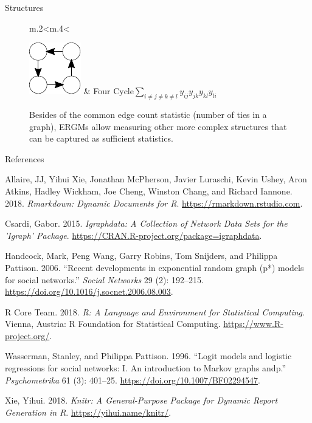 \documentclass[10pt,ignorenonframetext,aspectratio=169,]{beamer}
\begin{document}
\begin{frame}{Structures}
\begin{figure}
\begin{tabular}{m{.2\linewidth}<\centering m{.4\linewidth}<\raggedright}
\includegraphics[width=.45\linewidth]{terms/fourcycle.pdf} & Four Cycle\linebreak[4]$\sum_{i\neq j \neq k \neq l}y_{ij}y_{jk}y_{kl}y_{li}$  \\
\bottomrule
\end{tabular}
\caption{\label{fig:ergm-structs}Besides of the common edge count statistic (number of ties in a graph), ERGMs allow measuring other more complex structures that can be captured as sufficient statistics. }
\end{figure}

\end{frame}

\begin{frame}{References}
\protect\hypertarget{references}{}

\hypertarget{refs}{}
\leavevmode\hypertarget{ref-rmarkdown}{}%
Allaire, JJ, Yihui Xie, Jonathan McPherson, Javier Luraschi, Kevin
Ushey, Aron Atkins, Hadley Wickham, Joe Cheng, Winston Chang, and
Richard Iannone. 2018. \emph{Rmarkdown: Dynamic Documents for R}.
\url{https://rmarkdown.rstudio.com}.

\leavevmode\hypertarget{ref-Csardi2015}{}%
Csardi, Gabor. 2015. \emph{Igraphdata: A Collection of Network Data Sets
for the 'Igraph' Package}.
\url{https://CRAN.R-project.org/package=igraphdata}.

\leavevmode\hypertarget{ref-Handcock2006}{}%
Handcock, Mark, Peng Wang, Garry Robins, Tom Snijders, and Philippa
Pattison. 2006. ``Recent developments in exponential random graph (p*)
models for social networks.'' \emph{Social Networks} 29 (2): 192--215.
\url{https://doi.org/10.1016/j.socnet.2006.08.003}.

\leavevmode\hypertarget{ref-R}{}%
R Core Team. 2018. \emph{R: A Language and Environment for Statistical
Computing}. Vienna, Austria: R Foundation for Statistical Computing.
\url{https://www.R-project.org/}.

\leavevmode\hypertarget{ref-Wasserman1996}{}%
Wasserman, Stanley, and Philippa Pattison. 1996. ``Logit models and
logistic regressions for social networks: I. An introduction to Markov
graphs andp.'' \emph{Psychometrika} 61 (3): 401--25.
\url{https://doi.org/10.1007/BF02294547}.

\leavevmode\hypertarget{ref-knitr}{}%
Xie, Yihui. 2018. \emph{Knitr: A General-Purpose Package for Dynamic
Report Generation in R}. \url{https://yihui.name/knitr/}.

\end{frame}
\end{document}
